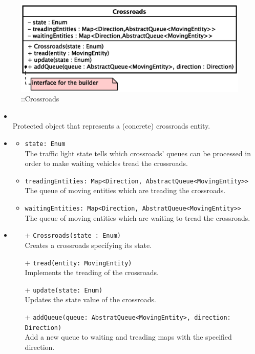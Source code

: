 \begin{figure}[h]
\centering
\includegraphics[scale=0.6,keepaspectratio]{images/solution/crossroads.eps}
\caption{\pReactiveComponent::Crossroads}
\label{fig:sd-app-crossroads}
\end{figure}
\FloatBarrier
\begin{itemize}
  \item \textbf{\descr} \\
    Protected object that represents a (concrete) crossroads entity.
  \item \textbf{\attrs}
  \begin{itemize}
    \item \texttt{state: Enum} \\
The traffic light state tells which crossroads' queues can be processed in
order to make waiting vehicles tread the crossroads.
    \item \texttt{treadingEntities: Map<Direction, AbstractQueue<MovingEntity>>} \\
The queue of moving entities which are treading the crossroads.
    \item \texttt{waitingEntities: Map<Direction, AbstratQueue<MovingEntity>>} \\
The queue of moving entities which are waiting to tread the crossroads. 
  \end{itemize}
  \item \textbf{\ops}
  \begin{itemize}
    \item[+] \texttt{Crossroads(state : Enum)} \\
Creates a crossroads specifying its state.
    \item[+] \texttt{tread(entity: MovingEntity)} \\
Implements the treading of the crossroads.
    \item[+] \texttt{update(state: Enum)} \\
Updates the state value of the crossroads.
    \item[+] \texttt{addQueue(queue: AbstratQueue<MovingEntity>, direction: 
Direction)} \\
Add a new queue to waiting and treading maps with the specified direction.
  \end{itemize}
\end{itemize}
